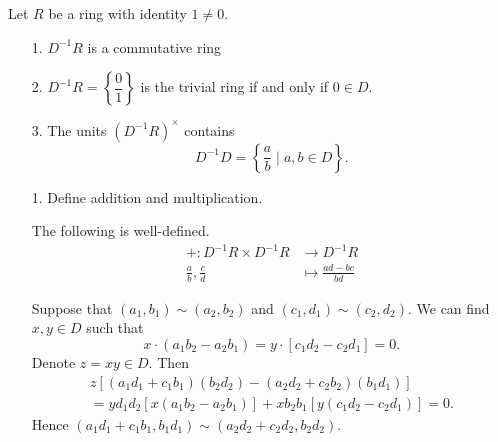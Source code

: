 \documentclass[12pt,letterpaper]{algebra_book}
\theoremstyle{definition}
\begin{document}
    \begin{proposition}
        Let $R$ be a ring with identity $1 \ne 0$. 

        \begin{itemize} 
            \item[1.] $D^{-1}R$ is a commutative ring 
            \item[2.] $D^{-1}R = \left\{\dfrac{0}{1}\right\}$ is
            the trivial ring if and only if $0 \in D$.
            \item[3.] The units $(D^{-1}R)^\times$ contains 
            \[
                D^{-1}D = \left\{ \frac{a}{b} \mid a, b \in D \right\}.
            \] 
        \end{itemize}
    \end{proposition}

    \begin{prf}
        \begin{itemize}
            \item[1.]
            Define addition and multiplication. 
            \begin{lemma}
                The following is well-defined. 
                \begin{align*}
                    +: D^{-1}R \times D^{-1}R &\longrightarrow D^{-1}R\\
                    \frac{a}{b}, \frac{c}{d} &\longmapsto \frac{ad - bc}{bd}
                \end{align*}
            \end{lemma}
            Suppose that $(a_1, b_1) \sim (a_2, b_2)$ and $(c_1, d_1)
            \sim (c_2, d_2)$. We can find $x, y \in D$ such that 
            \[
                x \cdot (a_1b_2 - a_2b_1) = y \cdot[c_1d_2 - c_2d_1] = 0.
            \]
            Denote $z = xy \in D$. Then 
            \begin{align*}
                z[(a_1d_1 + c_1b_1)(b_2d_2) - (a_2d_2 + c_2b_2)(b_1d_1)]
                \\=
                yd_1d_2[x(a_1b_2 - a_2b_1)]
                + xb_2b_1[y(c_1d_2 - c_2d_1)] = 0.
            \end{align*}
            Hence $(a_1d_1 + c_1b_1, b_1d_1) \sim (a_2d_2 + c_2d_2,
            b_2d_2)$. 


\end{itemize}
\end{prf}
\end{document}
